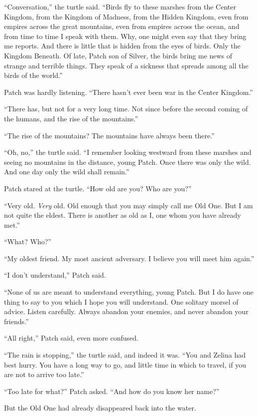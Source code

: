 \documentclass[ebook,oneside,openany,12pt]{memoir}
\begin{document}
“Conversation,” the turtle said. “Birds fly to these marshes from the
Center Kingdom, from the Kingdom of Madness, from the Hidden Kingdom,
even from empires across the great mountains, even from empires across
the ocean, and from time to time I speak with them. Why, one might
even say that they bring me reports. And there is little that is
hidden from the eyes of birds. Only the Kingdom Beneath. Of late,
Patch son of Silver, the birds bring me news of strange and terrible
things. They speak of a sickness that spreads among all the birds of
the world.”

Patch was hardly listening. “There hasn’t ever been war in the Center
Kingdom.”

“There has, but not for a very long time. Not since before the second
coming of the humans, and the rise of the mountains.”

“The rise of the mountains? The mountains have always been there.”

“Oh, no,” the turtle said. “I remember looking westward from these
marshes and seeing no mountains in the distance, young Patch. Once
there was only the wild. And one day only the wild shall remain.”

Patch stared at the turtle. “How old are you? Who are you?”

“Very old. \emph{Very} old. Old enough that you may simply call me
Old One. But I am not quite the eldest. There is another as old as I,
one whom you have already met.”

“What? Who?”

“My oldest friend. My most ancient adversary. I believe you will meet
him again.”

“I don’t understand,” Patch said.

“None of us are meant to understand everything, young Patch. But I do
have one thing to say to you which I hope you will understand. One
solitary morsel of advice. Listen carefully. Always abandon your
enemies, and never abandon your friends.”

“All right,” Patch said, even more confused.

“The rain is stopping,” the turtle said, and indeed it was. “You and
Zelina had best hurry. You have a long way to go, and little time in
which to travel, if you are not to arrive too late.”

“Too late for what?” Patch asked. “And how do you know her name?”

But the Old One had already disappeared back into the water.
\end{document}

